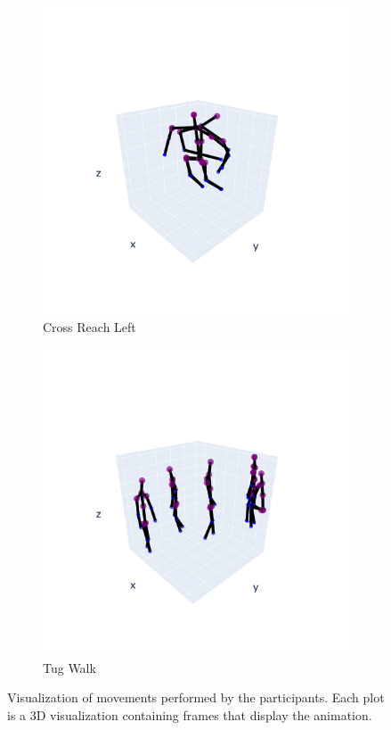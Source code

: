 \begin{figure}[h]
            \begin{subfigure}{.5\textwidth}
                \centering
                \includegraphics[width=.9\linewidth]{../src/resources/mov-plots/mov-2.png}
                \caption{Cross Reach Left}
                \label{fig:mov-2}
            \end{subfigure}
            \begin{subfigure}{.5\textwidth}
                \centering
                \includegraphics[width=.9\linewidth]{../src/resources/mov-plots/mov-9.png}
                \caption{Tug Walk}
                \label{fig:mov-9}
            \end{subfigure}
            
            \caption{Visualization of movements performed by the participants. Each plot is a 3D visualization containing frames that display the animation.}
            \label{fig:movements_visualization}
        \end{figure}

